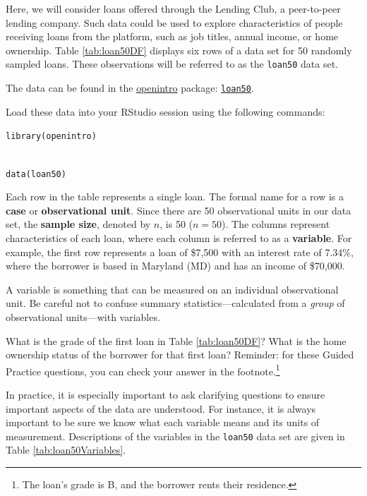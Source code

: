 \documentclass[
  10pt,
  openany]{book}
\theoremstyle{definition}
\theoremstyle{definition}
\theoremstyle{definition}
\theoremstyle{definition}
\theoremstyle{remark}
\begin{document}

Here, we will consider loans offered through the Lending Club, a peer-to-peer lending company. Such data could be used to explore characteristics of people receiving loans from the platform, such as job titles, annual income, or home ownership. Table \ref{tab:loan50DF} displays six rows of a data set for 50 randomly sampled loans. These observations will be referred to as the \texttt{loan50} data set.

The data can be found in the \href{http://openintrostat.github.io/openintro}{openintro} package: \href{http://openintrostat.github.io/openintro/reference/loan50.html}{\texttt{loan50}}.

Load these data into your RStudio session using the following commands:

\texttt{library(openintro)}\strut \\
\texttt{data(loan50)}

Each row in the table represents a single loan.
The formal name for a row is a \textbf{case} or \textbf{observational unit}. Since there are 50 observational units in our data set, the \textbf{sample size}, denoted by \(n\), is 50 (\(n = 50\)).
The columns represent characteristics of each loan, where each column is referred to as a \textbf{variable}. For example, the first row represents a loan of \$7,500 with an interest rate of 7.34\%, where the borrower is based in Maryland (MD) and has an income of \$70,000.

A variable is something that can be measured on an individual observational unit.
Be careful not to confuse summary statistics---calculated from a \emph{group} of observational units---with variables.

What is the grade of the first loan in Table \ref{tab:loan50DF}?
What is the home ownership status of the borrower for that first loan?
Reminder: for these Guided Practice questions, you can check your answer in the footnote.\footnote{The loan's grade is B, and the borrower rents their residence.}

In practice, it is especially important to ask clarifying questions to ensure important aspects of the data are understood.
For instance, it is always important to be sure we know what each variable means and its units of measurement.
Descriptions of the variables in the \texttt{loan50} data set are given in Table \ref{tab:loan50Variables}.
\end{document}
